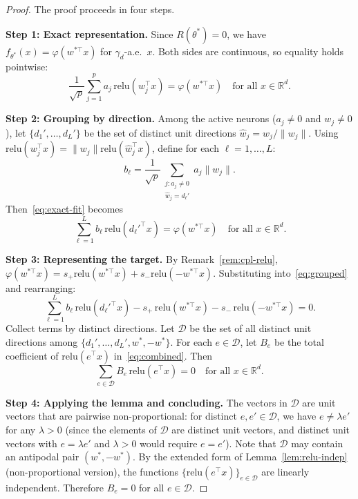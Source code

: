 \documentclass[11pt]{amsart}
\theoremstyle{definition}
\newcommand{\R}{\mathbb{R}}
\newcommand{\norm}[1]{\| #1 \|}
\newcommand{\relu}{\mathrm{relu}}
\begin{document}
\begin{proof}
The proof proceeds in four steps.

\medskip

\noindent\textbf{Step 1: Exact representation.}
Since $R(\theta^*) = 0$, we have $f_{\theta^*}(x) = \varphi(w^{*\top}x)$ for $\gamma_d$-a.e.\ $x$. Both sides are continuous, so equality holds pointwise:
\begin{equation}\label{eq:exact-fit}
\frac{1}{\sqrt{p}} \sum_{j=1}^{p} a_j \, \relu(w_j^\top x) = \varphi(w^{*\top} x) \quad \text{for all } x \in \R^d.
\end{equation}

\medskip

\noindent\textbf{Step 2: Grouping by direction.}
Among the active neurons ($a_j \neq 0$ and $w_j \neq 0$), let $\{d_1', \ldots, d_L'\}$ be the set of distinct unit directions $\hat{w}_j = w_j/\norm{w_j}$. Using $\relu(w_j^\top x) = \norm{w_j} \relu(\hat{w}_j^\top x)$, define for each $\ell = 1, \ldots, L$:
\[
b_\ell = \frac{1}{\sqrt{p}} \sum_{\substack{j: a_j \neq 0 \\ \hat{w}_j = d_\ell'}} a_j \norm{w_j}.
\]
Then~\eqref{eq:exact-fit} becomes
\begin{equation}\label{eq:grouped}
\sum_{\ell=1}^{L} b_\ell \, \relu(d_\ell'^\top x) = \varphi(w^{*\top} x) \quad \text{for all } x \in \R^d.
\end{equation}

\medskip

\noindent\textbf{Step 3: Representing the target.}
By Remark~\ref{rem:cpl-relu}, $\varphi(w^{*\top}x) = s_+ \relu(w^{*\top}x) + s_- \relu(-w^{*\top}x)$. Substituting into~\eqref{eq:grouped} and rearranging:
\begin{equation}\label{eq:combined}
\sum_{\ell=1}^{L} b_\ell \, \relu(d_\ell'^\top x) - s_+ \, \relu(w^{*\top}x) - s_- \, \relu(-w^{*\top}x) = 0.
\end{equation}
Collect terms by distinct directions. Let $\mathcal{D}$ be the set of all distinct unit directions among $\{d_1', \ldots, d_L', w^*, -w^*\}$. For each $e \in \mathcal{D}$, let $B_e$ be the total coefficient of $\relu(e^\top x)$ in~\eqref{eq:combined}. Then
\[
\sum_{e \in \mathcal{D}} B_e \, \relu(e^\top x) = 0 \quad \text{for all } x \in \R^d.
\]

\medskip

\noindent\textbf{Step 4: Applying the lemma and concluding.}
The vectors in $\mathcal{D}$ are unit vectors that are pairwise non-proportional: for distinct $e, e' \in \mathcal{D}$, we have $e \neq \lambda e'$ for any $\lambda > 0$ (since the elements of $\mathcal{D}$ are distinct unit vectors, and distinct unit vectors with $e = \lambda e'$ and $\lambda > 0$ would require $e = e'$). Note that $\mathcal{D}$ may contain an antipodal pair $(w^*, -w^*)$. By the extended form of Lemma~\ref{lem:relu-indep} (non-proportional version), the functions $\{\relu(e^\top x)\}_{e \in \mathcal{D}}$ are linearly independent. Therefore $B_e = 0$ for all $e \in \mathcal{D}$.


\end{proof}
\end{document}
